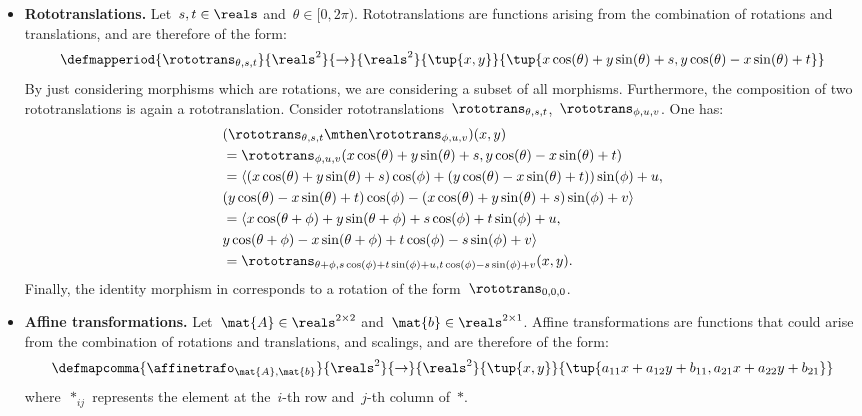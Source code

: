 \begin{solution}
\begin{itemize}
        \item \textbf{Rototranslations.}
              Let~$s,t\in \reals$ and~$\theta \in [0,2\pi)$.
              Rototranslations are functions arising from the combination of rotations and translations, and are therefore of the form:
              \begin{equation*}
                  \defmapperiod{\rototrans_{\theta,s,t}}{\reals^2}{\to}{\reals^2}{\tup{x,y}}{\tup{x\cos(\theta)+y\sin(\theta)+s, y\cos(\theta)-x\sin(\theta)+t}}
              \end{equation*}
              By just considering morphisms which are rotations, we are considering a subset of all morphisms.
              Furthermore, the composition of two rototranslations is again a rototranslation.
              Consider rototranslations~$\rototrans_{\theta,s,t}$,~$\rototrans_{\phi,u,v}$.
              One has:
              \begin{equation*}
                  \begin{aligned}
                       & (\rototrans_{\theta,s,t}\mthen \rototrans_{\phi,u,v})(x,y) \\
                       & =\rototrans_{\phi,u,v}(x\cos(\theta)+y\sin(\theta)+s, y\cos(\theta)-x\sin(\theta)+t) \\
                       & =\langle(x\cos(\theta)+y\sin(\theta)+s)\cos(\phi)+(y\cos(\theta)-x\sin(\theta)+t))\sin(\phi)+u, \\
                       & (y\cos(\theta)-x\sin(\theta)+t)\cos(\phi) - (x\cos(\theta)+y\sin(\theta)+s)\sin(\phi)+v\rangle \\
                       & =\langle x\cos(\theta+\phi)+y\sin(\theta+\phi)+s\cos(\phi)+t\sin(\phi)+u, \\
                       & y\cos(\theta+\phi)-x\sin(\theta+\phi)+t\cos(\phi)-s\sin(\phi)+v\rangle \\
                       & =\rototrans_{\theta+\phi,s\cos(\phi)+t\sin(\phi)+u, t\cos(\phi)-s\sin(\phi)+v}(x,y).
                  \end{aligned}
              \end{equation*}
              Finally, the identity morphism in \Draw corresponds to a rotation of the form~$\rototrans_{0,0,0}$.
        \item \textbf{Affine transformations.}
              Let~$\mat{A}\in \reals^{2\times 2}$ and~$\mat{b}\in \reals^{2\times 1}$.
              Affine transformations are functions that could arise from the combination of rotations and translations, and scalings, and are therefore of the form:
              \begin{equation*}
                  \defmapcomma{\affinetrafo_{\mat{A},\mat{b}}}{\reals^2}{\to}{\reals^2}{\tup{x,y}}{\tup{a_{11}x+a_{12}y+b_{11},a_{21}x+a_{22}y+b_{21}}}
              \end{equation*}
              where~$*_{ij}$ represents the element at the~$i$-th row and~$j$-th column of~$*$.


\end{itemize}
\end{solution}
